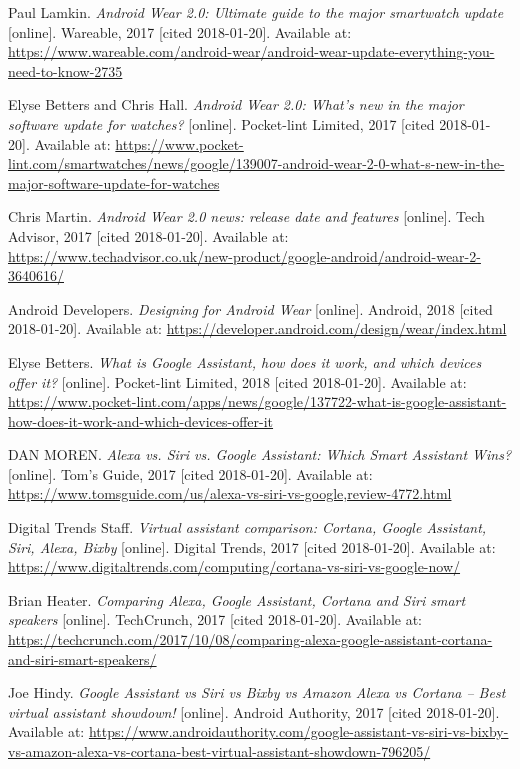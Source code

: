 \begin{thebibliography}{10}
Paul Lamkin. \textit{Android Wear 2.0: Ultimate guide to the major smartwatch update} [online]. Wareable, 2017 [cited 2018-01-20]. Available at: \url{https://www.wareable.com/android-wear/android-wear-update-everything-you-need-to-know-2735}

Elyse Betters and Chris Hall. \textit{Android Wear 2.0: What's new in the major software update for watches?} [online]. Pocket-lint Limited, 2017 [cited 2018-01-20]. Available at: \url{https://www.pocket-lint.com/smartwatches/news/google/139007-android-wear-2-0-what-s-new-in-the-major-software-update-for-watches}

Chris Martin. \textit{Android Wear 2.0 news: release date and features} [online]. Tech Advisor, 2017 [cited 2018-01-20]. Available at: \url{https://www.techadvisor.co.uk/new-product/google-android/android-wear-2-3640616/}

Android Developers. \textit{Designing for Android Wear} [online]. Android, 2018 [cited 2018-01-20]. Available at: \url{https://developer.android.com/design/wear/index.html}

Elyse Betters. \textit{What is Google Assistant, how does it work, and which devices offer it?} [online]. Pocket-lint Limited, 2018 [cited 2018-01-20]. Available at: \url{https://www.pocket-lint.com/apps/news/google/137722-what-is-google-assistant-how-does-it-work-and-which-devices-offer-it}


DAN MOREN. \textit{Alexa vs. Siri vs. Google Assistant: Which Smart Assistant Wins?} [online]. Tom's Guide, 2017 [cited 2018-01-20]. Available at: \url{https://www.tomsguide.com/us/alexa-vs-siri-vs-google,review-4772.html}

Digital Trends Staff. \textit{Virtual assistant comparison: Cortana, Google Assistant, Siri, Alexa, Bixby} [online]. Digital Trends, 2017 [cited 2018-01-20]. Available at: \url{https://www.digitaltrends.com/computing/cortana-vs-siri-vs-google-now/}

Brian Heater. \textit{Comparing Alexa, Google Assistant, Cortana and Siri smart speakers} [online]. TechCrunch, 2017 [cited 2018-01-20]. Available at: \url{https://techcrunch.com/2017/10/08/comparing-alexa-google-assistant-cortana-and-siri-smart-speakers/}

Joe Hindy. \textit{Google Assistant vs Siri vs Bixby vs Amazon Alexa vs Cortana – Best virtual assistant showdown!} [online]. Android Authority, 2017 [cited 2018-01-20]. Available at: \url{https://www.androidauthority.com/google-assistant-vs-siri-vs-bixby-vs-amazon-alexa-vs-cortana-best-virtual-assistant-showdown-796205/}


\end{thebibliography}
